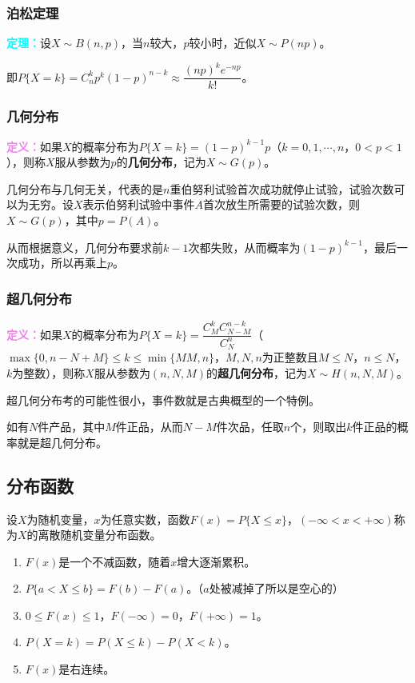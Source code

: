 \documentclass[UTF8, 12pt]{ctexart}
\begin{document}
\subsubsection{泊松定理}

\textcolor{aqua}{\textbf{定理：}}设$X\sim B(n,p)$，当$n$较大，$p$较小时，近似$X\sim P(np)$。

即$P\{X=k\}=C_n^kp^k(1-p)^{n-k}\approx\dfrac{(np)^ke^{-np}}{k!}$。

\subsubsection{几何分布}

\textcolor{violet}{\textbf{定义：}}如果$X$的概率分布为$P\{X=k\}=(1-p)^{k-1}p$（$k=0,1,\cdots,n$，$0<p<1$），则称$X$服从参数为$p$的\textbf{几何分布}，记为$X\sim G(p)$。

几何分布与几何无关，代表的是$n$重伯努利试验首次成功就停止试验，试验次数可以为无穷。设$X$表示伯努利试验中事件$A$首次放生所需要的试验次数，则$X\sim G(p)$，其中$p=P(A)$。

从而根据意义，几何分布要求前$k-1$次都失败，从而概率为$(1-p)^{k-1}$，最后一次成功，所以再乘上$p$。

\subsubsection{超几何分布}

\textcolor{violet}{\textbf{定义：}}如果$X$的概率分布为$P\{X=k\}=\dfrac{C_M^kC_{N-M}^{n-k}}{C_N^n}$（$\max\{0,n-N+M\}\leqslant k\leqslant\min\{MM,n\}$，$M,N,n$为正整数且$M\leqslant N$，$n\leqslant N$，$k$为整数），则称$X$服从参数为$(n,N,M)$的\textbf{超几何分布}，记为$X\sim H(n,N,M)$。

超几何分布考的可能性很小，事件数就是古典概型的一个特例。

如有$N$件产品，其中$M$件正品，从而$N-M$件次品，任取$n$个，则取出$k$件正品的概率就是超几何分布。

\subsection{分布函数}

设$X$为随机变量，$x$为任意实数，函数$F(x)=P\{X\leqslant x\}$，$(-\infty<x<+\infty)$称为$X$的离散随机变量分布函数。

\begin{enumerate}
    \item $F(x)$是一个不减函数，随着$x$增大逐渐累积。
    \item $P\{a<X\leqslant b\}=F(b)-F(a)$。（$a$处被减掉了所以是空心的）
    \item $0\leqslant F(x)\leqslant1$，$F(-\infty)=0$，$F(+\infty)=1$。
    \item $P(X=k)=P(X\leqslant k)-P(X<k)$。
    \item $F(x)$是右连续。
\end{enumerate}
\end{document}
